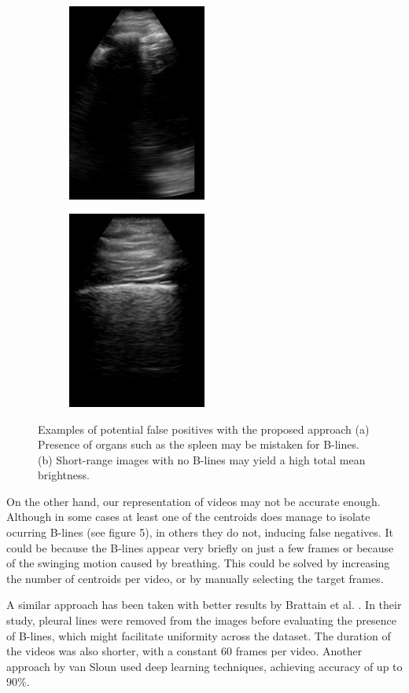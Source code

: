 \documentclass[12pt]{article} %
\begin{document}
	\begin{figure}[h]
	\centering
	\begin{subfigure}{0.4\textwidth}
	\centering
	\includegraphics[height=6.5cm]{figuras/spleen.jpg}
	\caption{}
	\end{subfigure}
	\begin{subfigure}{0.4\textwidth}
	\centering
	\includegraphics[height=6.5cm]{figuras/short_range.jpg}
	\caption{}
	\end{subfigure}
	\caption{Examples of potential false positives with the proposed approach (a) Presence of organs such as the spleen may be mistaken for B-lines. (b) Short-range images with no B-lines may yield a high total mean brightness.}
	\end{figure}
	
	On the other hand, our representation of videos may not be accurate enough. Although in some cases at least one of the centroids does manage to isolate ocurring B-lines (see figure 5), in others they do not, inducing false negatives. It could be because the B-lines appear very briefly on just a few frames or because of the swinging motion caused by breathing. This could be solved by increasing the number of centroids per video, or by manually selecting the target frames.
	
	A similar approach has been taken with better results by Brattain et al. \cite{brattain}. In their study, pleural lines were removed from the images before evaluating the presence of B-lines, which might facilitate uniformity across the dataset. The duration of the videos was also shorter, with a constant 60 frames per video. Another approach by van Sloun \cite{vanSloun} used deep learning techniques, achieving accuracy of up to $90 \%$.
	

	

\newpage
\newpage


\end{document}
